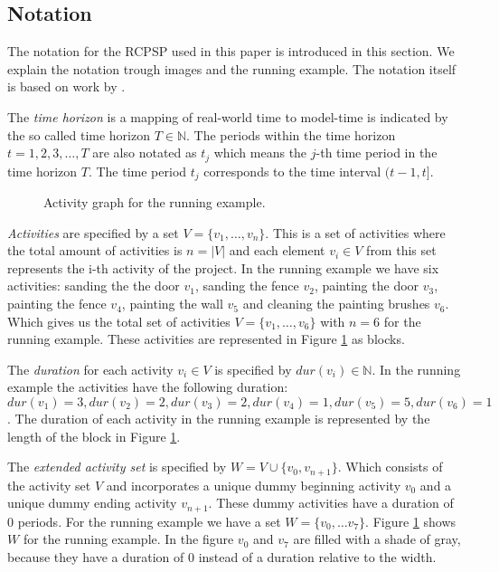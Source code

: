 \documentclass{article}
\theoremstyle{definition}
\newcommand{\inputtikz}[1]{}
\newcommand{\dur}[1]{\ensuremath{dur(v_{#1})}} %
\begin{document}
\subsection{Notation}
\label{text:definitions}
The notation for the RCPSP used in this paper is introduced in this section. We explain the notation trough images and the running example. The notation itself is based on work by \citet{brucker99}. 

The \emph{time horizon} is a mapping of real-world time to model-time is indicated by the so called time horizon $T \in \mathbb{N}$.
The periods within the time horizon $t=1,2,3,\ldots,T$ are also notated as $t_j$ which means the $j$-th time period in the time horizon $T$. 
The time period $t_j$ corresponds to the time interval $(t-1,t]$. 

\begin{figure}[ht]
	\centering
	\inputtikz{activity_graph}
	\caption{Activity graph for the running example.}
	\label{fig:activity_graph}
\end{figure}

\emph{Activities} are specified by a set $V = \{v_1, \ldots, v_n\}$.
This is a set of activities where the total amount of activities is $n = |V|$ and each element $v_i \in V$ from this set represents the i-th activity of the project.
In the running example we have six activities: sanding the the door $v_1$, sanding the fence $v_2$,  painting the door $v_3$, painting the fence $v_4$, painting the wall $v_5$ and cleaning the painting brushes $v_6$. 
Which gives us the total set of activities $V = \{v_1, \ldots, v_6\}$ with $n = 6$ for the running example.
These activities are represented in Figure \ref{fig:activity_graph} as blocks.

The \emph{duration} for each activity $v_i \in V$ is specified by $\dur{i} \in \mathbb{N}$.
In the running example the activities have the following duration: $\dur{1} = 3, \dur{2} = 2, \dur{3} = 2, \dur{4} = 1, \dur{5} = 5, \dur{6} = 1$. 
The duration of each activity in the running example is represented by the length of the block in Figure \ref{fig:activity_graph}.

The \emph{extended activity set} is specified by $W = V \cup \{v_0, v_{n+1}\}$.
Which consists of the activity set $V$ and incorporates a unique dummy beginning activity $v_0$ and a unique dummy ending activity $v_{n+1}$. 
These dummy activities have a duration of $0$ periods.
For the running example we have a set $W = \{v_0, \ldots v_7\}$.
Figure \ref{fig:activity_graph} shows $W$ for the running example.
In the figure $v_0$ and $v_7$ are filled with a shade of gray, because they have a duration of $0$ instead of a duration relative to the width. 
\end{document}
